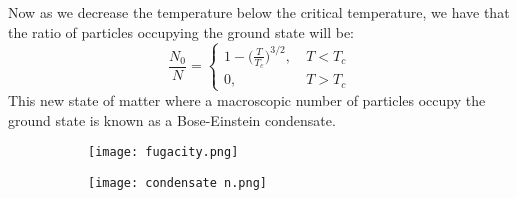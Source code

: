 \documentclass[a4paper,11pt,oneside]{book}
\begin{document}
Now as we decrease the temperature below the critical temperature, we have that the ratio of particles occupying the ground state will be:
\begin{equation}
   \frac{N_0}{N}=
    \begin{cases}
     1-\big(\frac{T}{T_c}\big)^{3/2}, \ &T<T_c\\
     0, \ &T>T_c
    \end{cases}
\end{equation}
This new state of matter where a macroscopic number of particles occupy the ground state is known as a Bose-Einstein condensate.
\begin{figure}[h!]
\centering
\begin{subfigure}{0.4\textwidth}
  \centering
  \texttt{[image: fugacity.png]}
  \label{fig:sub1}
\end{subfigure}%
\begin{subfigure}{0.5\textwidth}
  \centering
  \texttt{[image: condensate n.png]}
  \label{fig:sub1}
\end{subfigure}%
\label{fig:test}
\end{figure}
\end{document}
